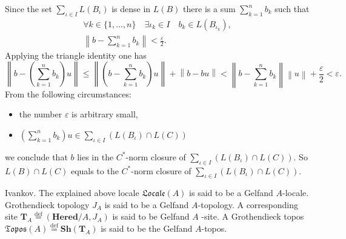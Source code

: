 \documentclass{beamer}
\theoremstyle{plain}
\newcommand{\bean}{\begin{eqnarray*}}
\newcommand{\eean}{\end{eqnarray*}}
\newcommand{\eps}{\varepsilon}                    %
\newcommand{\bydef}{\stackrel{\mathrm{def}}{=}}
\begin{document}
\begin{frame}
	
	Since the set $\sum_{\iota\in I}  L\left(B_\iota\right)$ is dense in $L\left(B\right)$ there is a sum $\sum_{k = 1}^n b_{k}$ such that
	\bean
	\forall k\in \{1,..., n\}\quad \exists \iota_k\in I \quad b_k \in L\left( B_{\iota_k}\right)  ,\\
	\left\|b - \sum_{k = 1}^n b_k \right\|< \frac{\eps}{2}.
	\eean
	Applying the triangle identity one has
	$$
	\left\|b -  \left( \sum_{k = 1}^n b_k\right)  u\right\|	\le 	\left\|\left( b -   \sum_{k = 1}^n b_k\right)  u\right\|+ \left\|b -   b  u\right\|< \left\| b -   \sum_{k = 1}^n b_k\right\|\left\|  u\right\|+ \frac{\eps}{2}< \eps.
	$$
	From the following circumstances:
	\begin{itemize}
		\item  the number $\eps$ is arbitrary small,
		\item $\left( \sum_{k = 1}^n b_k\right)  u\in \sum_{\iota\in I} \left( L\left(B_\iota\right)\cap L\left(C\right)\right)$
	\end{itemize}
	we conclude that $b$ lies in the $C^*$-norm closure of $\sum_{\iota\in I} \left( L\left(B_\iota\right)\cap L\left(C\right)\right)$. So $L\left(B\right)\cap L\left(C\right)$ equals to the $C^*$-norm closure of $\sum_{\iota\in I} \left( L\left(B_\iota\right)\cap L\left(C\right)\right)$.
\end{frame}
\begin{frame}
\begin{definition}\alert{Ivankov}.
	The explained above locale  $\mathfrak{Locale}\left(A \right)$ is said to be a \alert{Gelfand} $A$-\alert{locale}. Grothendieck topology $J_A$  is said to be a  \alert{Gelfand} $A$-\alert{topology}. A corresponding  site  $\mathbf{T}_A\bydef \left(\mathbf{Hered}/A, J_A\right)$ is said to be \alert{Gelfand}  $A$ -\alert{site}. A Grothendieck topos $\mathfrak{Topos}(A)\bydef \mathbf{Sh}\left(\mathbf{T}_A \right)$ is said to be the \alert{Gelfand} $A$-\alert{topos}.
\end{definition}
\end{frame}
\end{document}
